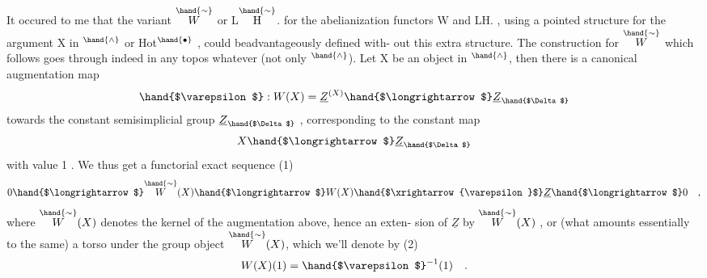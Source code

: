 It occured to me that the variant $\overset{\hand{\sim}}{W}$ or L$\overset{\hand{\sim}}{\mathrm{H}}$. 
for the abelianization functors W and LH. ,  using a pointed structure
for the argument X in \hand{$\Delta$}$^{\hand{\wedge}}$ or Hot$^{\hand{\bullet}}$ , could beadvantageously defined with-%
out this extra structure. The construction for $\overset{\hand{\sim}}{W}$ which follows goes
through indeed in any topos whatever (not only \hand{$\Delta$}$^{\hand{\wedge}}$). Let X be an object
in \hand{$\Delta$}$^{\hand{\wedge}}$, then there is a canonical augmentation map
\[ \hand{$\varepsilon$} : W(X) = \underline{Z}^{(X)} \hand{$\longrightarrow$} \underline{Z}_{\hand{$\Delta$}} \]
towards the constant semisimplicial group $\underline{Z}_{\hand{$\Delta$}}$ , corresponding to the
constant map
\[ X \hand{$\longrightarrow$} \underline{Z}_{\hand{$\Delta$}} \]
with value 1 . We thus get a functorial exact sequence
(1) \[ 0 \hand{$\longrightarrow$} \overset{\hand{\sim}}{W}(X) \hand{$\longrightarrow$} W(X) \hand{$\xrightarrow{\varepsilon}$} \underline{Z} \hand{$\longrightarrow$} 0 \quad , \]
where $\overset{\hand{\sim}}{W}(X)$ denotes the kernel of the augmentation above, hence an exten-%
sion of $\underline{Z}$ by $\overset{\hand{\sim}}{W}(X)$ , or (what amounts essentially to the same) a torso
under the group object $\overset{\hand{\sim}}{W}(X)$, which we'll denote by
(2) \[ W(X)(1) = \hand{$\varepsilon$}^{-1}(1) \quad . \]


